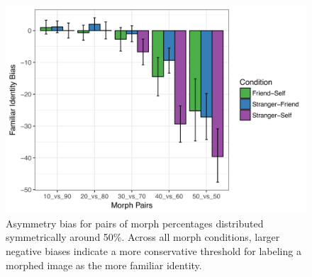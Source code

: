 \documentclass[10pt,letterpaper]{article}
\begin{document}
\begin{figure}[ht] %

\includegraphics[width=\textwidth]{final_figure5.png}

\caption{\color{Gray} Asymmetry bias for pairs of morph percentages distributed symmetrically around 50\%. Across all morph conditions, larger negative biases indicate a more conservative threshold for labeling a morphed image as the more familiar identity. }

\label{Figure 5} %

\end{figure}
\end{document}
